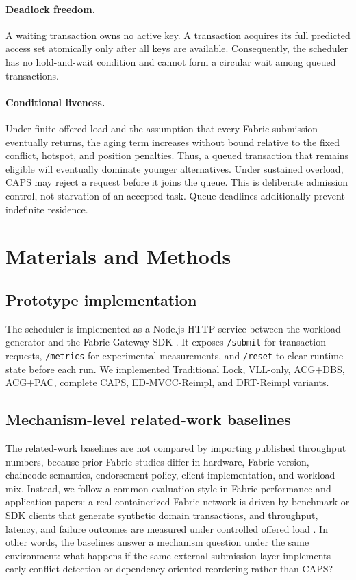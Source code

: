 \documentclass[fleqn,10pt,lineno]{wlpeerj}
\begin{document}
\paragraph{Deadlock freedom.}
A waiting transaction owns no active key. A transaction acquires its full predicted access set atomically only after all keys are available. Consequently, the scheduler has no hold-and-wait condition and cannot form a circular wait among queued transactions.

\paragraph{Conditional liveness.}
Under finite offered load and the assumption that every Fabric submission eventually returns, the aging term increases without bound relative to the fixed conflict, hotspot, and position penalties. Thus, a queued transaction that remains eligible will eventually dominate younger alternatives. Under sustained overload, CAPS may reject a request before it joins the queue. This is deliberate admission control, not starvation of an accepted task. Queue deadlines additionally prevent indefinite residence.

\section*{Materials and Methods}

\subsection*{Prototype implementation}

The scheduler is implemented as a Node.js HTTP service between the workload generator and the Fabric Gateway SDK \citep{fabric25gateway}. It exposes \texttt{/submit} for transaction requests, \texttt{/metrics} for experimental measurements, and \texttt{/reset} to clear runtime state before each run. We implemented Traditional Lock, VLL-only, ACG+DBS, ACG+PAC, complete CAPS, ED-MVCC-Reimpl, and DRT-Reimpl variants.

\subsection*{Mechanism-level related-work baselines}

The related-work baselines are not compared by importing published throughput numbers, because prior Fabric studies differ in hardware, Fabric version, chaincode semantics, endorsement policy, client implementation, and workload mix. Instead, we follow a common evaluation style in Fabric performance and application papers: a real containerized Fabric network is driven by benchmark or SDK clients that generate synthetic domain transactions, and throughput, latency, and failure outcomes are measured under controlled offered load \citep{dinh2017blockbench,thakkar2018performance,caliperdocs,chen2023tea,dash2024hcsrl,keo2025rubber}. In other words, the baselines answer a mechanism question under the same environment: what happens if the same external submission layer implements early conflict detection or dependency-oriented reordering rather than CAPS?
\end{document}

